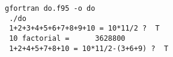 \begin{Verbatim}[frame=lines,label=do - commands and output]
 gfortran do.f95 -o do
 ./do
 1+2+3+4+5+6+7+8+9+10 = 10*11/2 ?  T
 10 factorial =      3628800
 1+2+4+5+7+8+10 = 10*11/2-(3+6+9) ?  T
\end{Verbatim}

